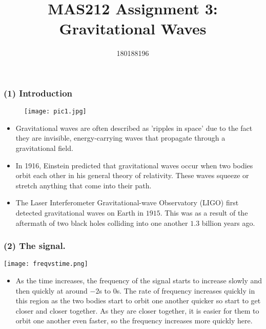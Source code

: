 \documentclass{beamer}
\title{MAS212 Assignment 3: Gravitational Waves}
\author{180188196}
\date{}
\begin{document}
\begin{frame}
\maketitle
\end{frame}
\begin{frame}
\frametitle{(1) Introduction}
\begin{figure}
\texttt{[image: pic1.jpg]} \footnotemark
\end{figure}
\small{}
\begin{itemize}\item Gravitational waves are often described as 'ripples in space' due to the fact they are invisible, energy-carrying waves that propagate through a gravitational field.
\item In 1916, Einstein predicted that gravitational waves occur when two bodies orbit each other in his general theory of relativity. These waves squeeze or stretch anything that come into their path.
\item The Laser Interferometer Gravitational-wave Observatory (LIGO) first detected gravitational waves on Earth in $1915.$ This was as a result of the aftermath of two black holes colliding into one another $1.3$ billion years ago.\footnotemark \end{itemize} 
\end{frame}
\begin{frame}
\frametitle{(2) The signal.} \centerline{
\texttt{[image: freqvstime.png]}}
\begin{itemize}\item \small{As the time increases, the frequency of the signal starts to increase slowly and then quickly at around $-2$s to $0$s. The rate of frequency increases quickly in this region as the two bodies start to orbit one another quicker so start to get closer and closer together. As they are closer together, it is easier for them to orbit one another even faster, so the frequency increases more quickly here.} \end{itemize}
\end{frame}
\end{document}
